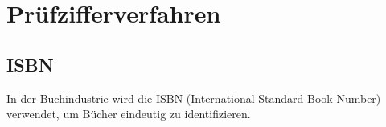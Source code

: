 \chapter{Prüfzifferverfahren}


\section{ISBN}

In der Buchindustrie wird die ISBN (International Standard Book Number) verwendet, um Bücher eindeutig zu identifizieren.
